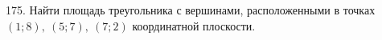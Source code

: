 175. Найти площадь треугольника с вершинами, расположенными в точках $(1;8),\ (5;7),\ (7;2)$ координатной плоскости.\\
